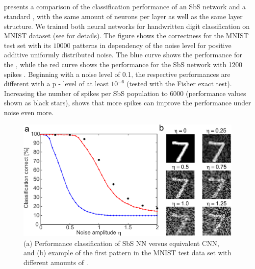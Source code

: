 \subsection{}

  presents a comparison of the classification performance of an SbS network and a standard , with the same amount of
neurons per layer as well as the same layer structure. We trained both neural networks for handwritten digit classification on MNIST dataset\cite{lecun1998mnist} (see \cite{rotermund2019Backpropagation} for details). The figure shows the correctness for the MNIST test set with its $10000$ patterns in dependency of the noise level for positive additive
uniformly distributed noise. The blue curve shows the performance for
the , while the red curve shows the performance for
the SbS network with 1200 spikes . Beginning
with a noise level of 0.1, the respective performances are different
with a p - level of at least $10^{-6}$ (tested with the Fisher exact
test). Increasing the number of spikes per SbS population to 6000
(performance values shown as black stars), shows that more spikes can
improve the performance under noise even more.

\begin{figure}[t!]
	\includegraphics[width=\columnwidth]{../figures/sbs_robustnes.pdf}
	\caption{(a) Performance classification of SbS NN versus equivalent CNN, and (b) example of the first pattern in the MNIST test data set with different amounts of .}
	\label{fig:robustnes_sbs}
\end{figure}

